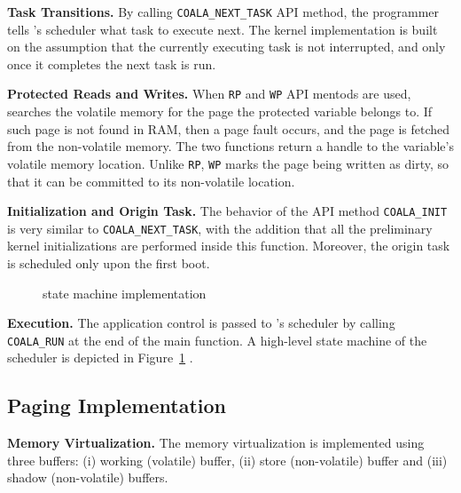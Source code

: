 \noindent \textbf{Task Transitions.} By calling \texttt{COALA\_NEXT\_TASK} API method, the programmer tells \sys's scheduler what task to execute next. The \sys kernel implementation is built on the assumption that the currently executing task is not interrupted, and only once it completes the next task is run. 

\noindent \textbf{Protected Reads and Writes.} When \texttt{RP} and \texttt{WP} API mentods are used, \sys searches the volatile memory for the page the protected variable belongs to. If such page is not found in RAM, then a page fault occurs, and the page is fetched from the non-volatile memory. The two functions return a handle to the variable's volatile memory location. Unlike \texttt{RP}, \texttt{WP} marks the page being written as dirty, so that it can be committed to its non-volatile location.

\noindent \textbf{Initialization and Origin Task.} The behavior of the API method \texttt{COALA\_INIT} is very similar to \texttt{COALA\_NEXT\_TASK}, with the addition that all the preliminary kernel initializations are performed inside this function. Moreover, the origin task is scheduled only upon the first boot.

\begin{figure}
	\centering
	\caption{\sys state machine implementation }
	\label{fig:coala_state_machine}
\end{figure}

\noindent \textbf{Execution.} The application control is passed to \sys's scheduler by calling \texttt{COALA\_RUN} at the end of the main function. A high-level state machine of the scheduler is depicted in Figure~\ref{fig:coala_state_machine} .

\subsection{\sys Paging Implementation}

\noindent \textbf{Memory Virtualization.} The memory virtualization is implemented using three buffers: (i) working (volatile) buffer, (ii) store (non-volatile) buffer and (iii) shadow (non-volatile) buffers. 

